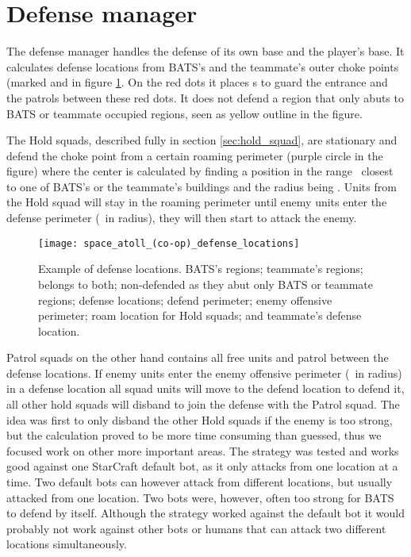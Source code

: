 \section{Defense manager}
\label{sec:defense_manager}
The defense manager handles the defense of its own base and the player’s base. It calculates defense
locations from BATS's and the teammate's outer choke points (marked \usebox{\LegendDotRed} and
\usebox{\LegendDotOrange} in figure \ref{fig:defense_locations}. On the red dots it places
s to guard the entrance and the  patrols between
these red dots. It does not defend a region that only abuts to BATS or teammate
occupied regions, seen as yellow outline in the figure.

The Hold squads, described fully in section \ref{sec:hold_squad}, are stationary and defend the
choke point from a certain roaming perimeter (purple circle in the figure) where the center is
calculated by finding a position in the range \squadDefendRoamDistanceMinMax~closest to one of
BATS’s or the teammate’s buildings and the radius being \squadDefendRoamPerimeter. Units from the
Hold squad will stay in the roaming perimeter until enemy units enter the defense perimeter
(\squadDefendDefendPerimeter~in radius), they will then start to attack the enemy. 

\begin{figure}[htb]
\centering
\texttt{[image: space\_atoll\_(co-op)\_defense\_locations]}
\caption[Defense locations example]{
	Example of defense locations.
	\usebox{\LegendLineLightGreen} BATS’s regions;
	\usebox{\LegendLineLightBlue} teammate’s regions;
	\usebox{\LegendLineLightGreenLightBlue} belongs to both;
	\usebox{\LegendLineYellow} non-defended as they abut only BATS or teammate regions;
	\usebox{\LegendDotRed} defense locations;
	\usebox{\LegendCircleRed} defend perimeter;
	\usebox{\LegendCircleBrown} enemy offensive perimeter;
	\usebox{\LegendCircleViolet} roam location for Hold squads; and
	\usebox{\LegendDotOrange} teammate's defense location.}
\label{fig:defense_locations}
\end{figure}

Patrol squads on the other hand contains all free units and patrol between the defense locations. If
enemy units enter the enemy offensive perimeter (\squadDefendEnemyOffensivePerimeter~in radius) in a
defense location all squad units will move to the defend location to defend it, all other hold
squads will disband to join the defense with the Patrol squad. The idea was first to only disband
the other Hold squads if the enemy is too strong, but the calculation proved to be more time
consuming than guessed, thus we focused work on other more important areas. The strategy was tested
and works good against one StarCraft default bot, as it only attacks from one location at a time.
Two default bots can however attack from different locations, but usually attacked from one
location. Two bots were, however, often too strong for BATS to defend by itself. Although the
strategy worked against the default bot it would probably not work against other bots or humans that
can attack two different locations simultaneously.


